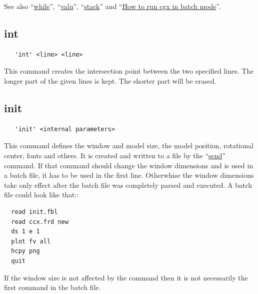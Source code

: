 \documentclass{article}
\providecommand{\htmlref}[2]{\hyperref[#2]{#1}}
\begin{document}
See also ``\htmlref{while}{while}'', ``\htmlref{valu}{valu}'', ``\htmlref{stack}{stack}'' and ``\htmlref{How to run cgx in batch mode}{How to run cgx in batch mode}''.

\subsection{\label{int}int}
\begin{verbatim}
   'int' <line> <line>
\end{verbatim}
This command creates the intersection point between the two specified lines. The longer part of the given lines is kept. The shorter part will be erased.

\subsection{\label{init}init}
\begin{verbatim}
   'init' <internal parameters>
\end{verbatim}
This command defines the window and model size, the model position, rotational center, fonts and others. It is created and written to a file by the
``\htmlref{send}{send}'' command. If that command should change the window dimensions and is used in a batch file, it has to be used in the first line. Otherwhise the window dimensions take only effect after the batch file was completely parsed and executed. A batch file could look like that::
\begin{verbatim}
  read init.fbl
  read ccx.frd new
  ds 1 e 1
  plot fv all
  hcpy png
  quit   
\end{verbatim}
If the window size is not affected by the command then it is not necessarily the first command in the batch file.
\end{document}

